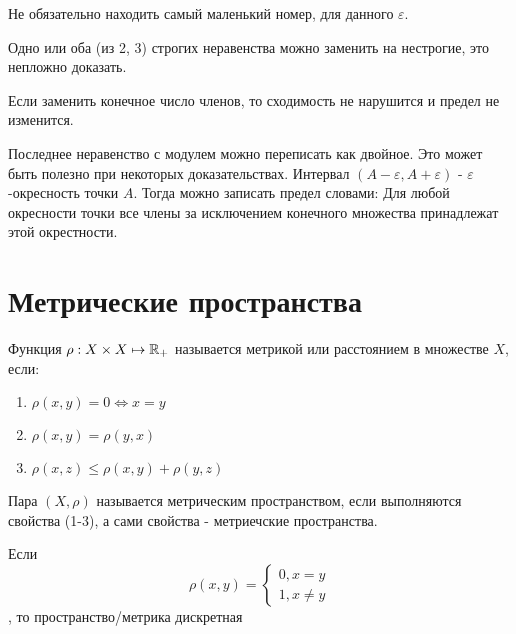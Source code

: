 \documentclass[12pt, a4paper]{article}
\begin{document}
  \begin{note}
  Не обязательно находить самый маленький номер, для данного $\varepsilon$.
  \end{note}

  \begin{note}
  Одно или оба (из 2, 3) строгих неравенства можно заменить на нестрогие, это непложно доказать.
  \end{note}

  \begin{note}
  Если заменить конечное число членов, то сходимость не нарушится и предел не изменится.
  \end{note}

  \begin{note}
  Последнее неравенство с модулем можно переписать как двойное. Это может быть полезно при некоторых доказательствах.
  Интервал $(A - \varepsilon, A + \varepsilon)$ - $\varepsilon$-окресность точки $A$.
  Тогда можно записать предел словами:
  Для любой окресности точки все члены за исключением конечного множества принадлежат этой окрестности.
  \end{note}


  \section{Метрические пространства}

  \begin{definition}
  Функция $\rho: X \times X \mapsto {\mathbb{R}}_{+}$ называется метрикой или расстоянием в множестве $X$, если:

  \begin{enumerate}
    \item $\rho (x, y) = 0 \Leftrightarrow x = y$
    \item  $\rho (x, y) = \rho (y, x)$
    \item $\rho (x, z) \leqslant \rho (x, y) + \rho (y, z)$
  \end{enumerate}
  \end{definition}

  \begin{definition}

  Пара $(X, \rho)$ называется метрическим пространством, если выполняются свойства (1-3), а сами свойства - метриечские пространства.
  \end{definition}

  \begin{example}
  Если \begin{equation}
    \rho(x, y) = \begin{cases}
      0, x = y \\
      1, x \neq y
    \end{cases}
  \end{equation}, то пространство/метрика дискретная
  \end{example}
\end{document}
